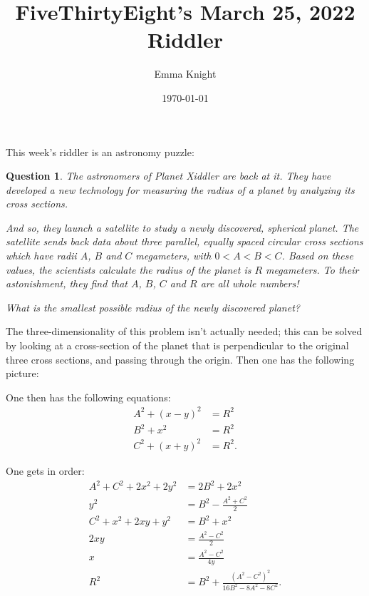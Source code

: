 \documentclass[11pt]{article}
\title{FiveThirtyEight's March 25, 2022 Riddler}
\author{Emma Knight}
\date{\today}
\newtheorem{question}[theorem]{Question}
\theoremstyle{definition}
\begin{document}
\maketitle
This week's riddler is an astronomy puzzle:
\begin{question}
The astronomers of Planet Xiddler are back at it. They have developed a new technology for measuring the radius of a planet by analyzing its cross sections.

And so, they launch a satellite to study a newly discovered, spherical planet. The satellite sends back data about three parallel, equally spaced circular cross sections which have radii $A$, $B$ and $C$ megameters, with $0 < A < B < C$. Based on these values, the scientists calculate the radius of the planet is $R$ megameters. To their astonishment, they find that $A$, $B$, $C$ and $R$ are all whole numbers!

What is the smallest possible radius of the newly discovered planet?
\end{question}

The three-dimensionality of this problem isn't actually needed; this can be solved by looking at a cross-section of the planet that is perpendicular to the original three cross sections, and passing through the origin.  Then one has the following picture:


One then has the following equations:
\begin{align*}
A^2 + (x-y)^2 & = R^2 \\
B^2 + x^2 & = R^2 \\
C^2 + (x+y)^2 & = R^2.
\end{align*}

One gets in order:
\begin{align*}
A^2 + C^2 + 2x^2 + 2y^2 & = 2B^2 + 2x^2 \\
y^2 & = B^2 - \frac{A^2 + C^2}{2} \\
C^2 + x^2 + 2xy + y^2 & = B^2 + x^2 \\
2xy & = \frac{A^2 - C^2}{2} \\
x & = \frac{A^2 - C^2}{4y} \\
R^2 & = B^2 + \frac{(A^2 - C^2)^2}{16B^2 - 8A^2 - 8C^2}.
\end{align*}
\end{document}
